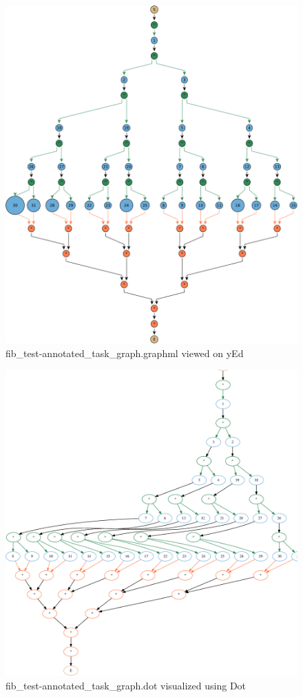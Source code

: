 \documentclass[11pt,a4paper,notitlepage]{article}
\begin{document}
\begin{figure}[!ht]
\centering
\includegraphics[width=\textwidth]{figures/fib_test-10_4-annotated_task_graph-yed.pdf}
\caption{fib\_test-annotated\_task\_graph.graphml viewed on yEd}
\label{fig:yed-atg}
\end{figure}

\begin{figure}[!ht]
\centering
\includegraphics[width=\textwidth]{figures/fib_test-10_4-annotated_task_graph-dot.eps}
\caption{fib\_test-annotated\_task\_graph.dot visualized using Dot}
\label{fig:dot-atg}
\end{figure}
\end{document}
